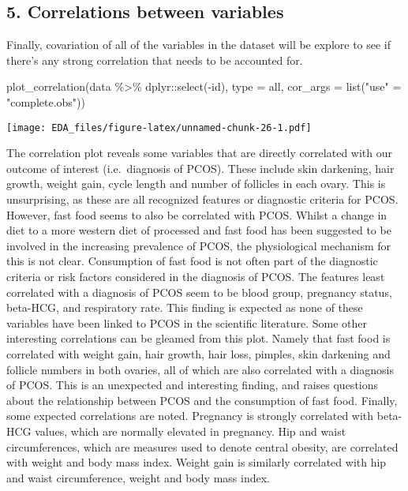 \documentclass[
]{article}
\newenvironment{Shaded}{\begin{snugshade}}{\end{snugshade}}
\newcommand{\AttributeTok}[1]{\textcolor[rgb]{0.77,0.63,0.00}{#1}}
\newcommand{\FunctionTok}[1]{\textcolor[rgb]{0.00,0.00,0.00}{#1}}
\newcommand{\NormalTok}[1]{#1}
\newcommand{\OtherTok}[1]{\textcolor[rgb]{0.56,0.35,0.01}{#1}}
\newcommand{\SpecialCharTok}[1]{\textcolor[rgb]{0.00,0.00,0.00}{#1}}
\newcommand{\StringTok}[1]{\textcolor[rgb]{0.31,0.60,0.02}{#1}}
\begin{document}
\hypertarget{correlations-between-variables}{%
\subsection{5. Correlations between
variables}\label{correlations-between-variables}}

Finally, covariation of all of the variables in the dataset will be
explore to see if there's any strong correlation that needs to be
accounted for.

\begin{Shaded}
\begin{Highlighting}[]
\FunctionTok{plot\_correlation}\NormalTok{(data }\SpecialCharTok{\%\textgreater{}\%} 
\NormalTok{                   dplyr}\SpecialCharTok{::}\FunctionTok{select}\NormalTok{(}\SpecialCharTok{{-}}\NormalTok{id), }
                 \AttributeTok{type =} \StringTok{\textquotesingle{}all\textquotesingle{}}\NormalTok{,}
                 \AttributeTok{cor\_args =} \FunctionTok{list}\NormalTok{(}\StringTok{"use"} \OtherTok{=} \StringTok{"complete.obs"}\NormalTok{))}
\end{Highlighting}
\end{Shaded}

\texttt{[image: EDA\_files/figure-latex/unnamed-chunk-26-1.pdf]}

The correlation plot reveals some variables that are directly correlated
with our outcome of interest (i.e.~diagnosis of PCOS). These include
skin darkening, hair growth, weight gain, cycle length and number of
follicles in each ovary. This is unsurprising, as these are all
recognized features or diagnostic criteria for PCOS. However, fast food
seems to also be correlated with PCOS. Whilst a change in diet to a more
western diet of processed and fast food has been suggested to be
involved in the increasing prevalence of PCOS, the physiological
mechanism for this is not clear. Consumption of fast food is not often
part of the diagnostic criteria or risk factors considered in the
diagnosis of PCOS. The features least correlated with a diagnosis of
PCOS seem to be blood group, pregnancy status, beta-HCG, and respiratory
rate. This finding is expected as none of these variables have been
linked to PCOS in the scientific literature. Some other interesting
correlations can be gleamed from this plot. Namely that fast food is
correlated with weight gain, hair growth, hair loss, pimples, skin
darkening and follicle numbers in both ovaries, all of which are also
correlated with a diagnosis of PCOS. This is an unexpected and
interesting finding, and raises questions about the relationship between
PCOS and the consumption of fast food. Finally, some expected
correlations are noted. Pregnancy is strongly correlated with beta-HCG
values, which are normally elevated in pregnancy. Hip and waist
circumferences, which are measures used to denote central obesity, are
correlated with weight and body mass index. Weight gain is similarly
correlated with hip and waist circumference, weight and body mass index.
\end{document}
